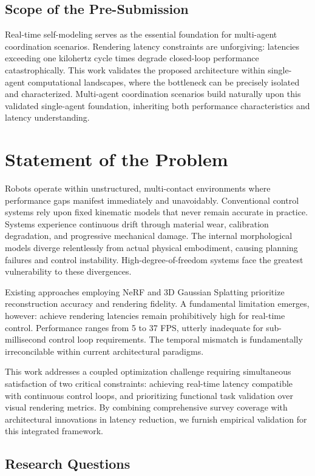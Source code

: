 ﻿\documentclass[11pt,a4paper]{article}
\begin{document}
\subsection{Scope of the Pre-Submission}
Real-time self-modeling serves as the essential foundation for multi-agent coordination scenarios. Rendering latency constraints are unforgiving: latencies exceeding one kilohertz cycle times degrade closed-loop performance catastrophically. This work validates the proposed architecture within single-agent computational landscapes, where the bottleneck can be precisely isolated and characterized. Multi-agent coordination scenarios build naturally upon this validated single-agent foundation, inheriting both performance characteristics and latency understanding.

\section{Statement of the Problem}
Robots operate within unstructured, multi-contact environments where performance gaps manifest immediately and unavoidably. Conventional control systems rely upon fixed kinematic models that never remain accurate in practice. Systems experience continuous drift through material wear, calibration degradation, and progressive mechanical damage. The internal morphological models diverge relentlessly from actual physical embodiment, causing planning failures and control instability. High-degree-of-freedom systems face the greatest vulnerability to these divergences. 

Existing approaches employing NeRF and 3D Gaussian Splatting prioritize reconstruction accuracy and rendering fidelity. A fundamental limitation emerges, however: achieve rendering latencies remain prohibitively high for real-time control. Performance ranges from 5 to 37 FPS, utterly inadequate for sub-millisecond control loop requirements. The temporal mismatch is fundamentally irreconcilable within current architectural paradigms.

This work addresses a coupled optimization challenge requiring simultaneous satisfaction of two critical constraints: achieving real-time latency compatible with continuous control loops, and prioritizing functional task validation over visual rendering metrics. By combining comprehensive survey coverage with architectural innovations in latency reduction, we furnish empirical validation for this integrated framework.

\subsection{Research Questions}
\end{document}

